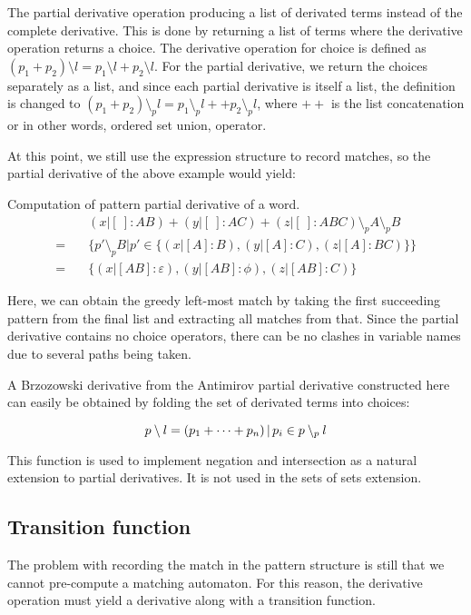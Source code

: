 The partial derivative operation producing a list of derivated terms instead of
the complete derivative. This is done by returning a list of terms where the
derivative operation returns a choice. The derivative operation for choice is
defined as $(p_1 + p_2) \setminus l = p_1 \setminus l + p_2 \setminus l$. For
the partial derivative, we return the choices separately as a list, and since
each partial derivative is itself a list, the definition is changed to $(p_1 +
p_2) \setminus_p l = p_1 \setminus_p l ++ p_2 \setminus_p l$, where $++$ is the
list concatenation or in other words, ordered set union, operator.

At this point, we still use the expression structure to record matches, so the
partial derivative of the above example would yield:

\begin{eg}
   Computation of pattern partial derivative of a word.
   \begin{align*}
        &\quad (x|[\:]:AB)+(y|[\:]:AC)+(z|[\:]:ABC) \setminus_p A \setminus_p B \\
      = &\quad \{ p' \setminus_p B | p' \in \{(x|[A]:B), (y|[A]:C), (z|[A]:BC)\} \} \\
      = &\quad \{ (x|[AB]:\varepsilon), (y|[AB]:\phi), (z|[AB]:C) \}
   \end{align*}
\end{eg}

Here, we can obtain the greedy left-most match by taking the first succeeding
pattern from the final list and extracting all matches from that. Since the
partial derivative contains no choice operators, there can be no clashes in
variable names due to several paths being taken.

A Brzozowski derivative from the Antimirov partial derivative constructed here
can easily be obtained by folding the set of derivated terms into choices:

\[p \setminus l = (p_1 + \dots + p_n) \operatorname{|} p_i \in p \setminus_p l \]

This function is used to implement negation and intersection as a natural
extension to partial derivatives. It is not used in the sets of sets extension.


\subsection{Transition function}

The problem with recording the match in the pattern structure is still that we
cannot pre-compute a matching automaton. For this reason, the derivative
operation must yield a derivative along with a transition function.

